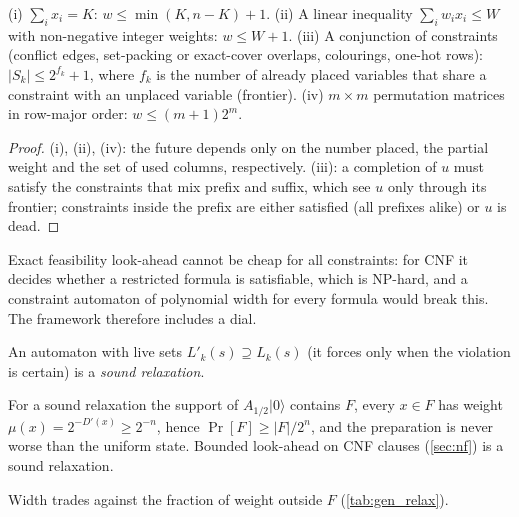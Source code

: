 \begin{proposition}\label{prop:width}
(i) $\sum_ix_i=K$: $w\le\min(K,n-K)+1$. (ii) A linear inequality $\sum_iw_ix_i\le W$ with non-negative integer weights: $w\le W+1$. (iii) A conjunction of constraints (conflict edges, set-packing or exact-cover overlaps, colourings, one-hot rows): $|S_k|\le2^{f_k}+1$, where $f_k$ is the number of already placed variables that share a constraint with an unplaced variable (frontier). (iv) $m\times m$ permutation matrices in row-major order: $w\le(m+1)2^m$.
\end{proposition}
\begin{proof}
(i), (ii), (iv): the future depends only on the number placed, the partial weight and the set of used columns, respectively. (iii): a completion of $u$ must satisfy the constraints that mix prefix and suffix, which see $u$ only through its frontier; constraints inside the prefix are either satisfied (all prefixes alike) or $u$ is dead.
\end{proof}
Exact feasibility look-ahead cannot be cheap for all constraints: for CNF it decides whether a restricted formula is satisfiable, which is NP-hard, and a constraint automaton of polynomial width for every formula would break this. The framework therefore includes a dial.
\begin{definition}
An automaton with live sets $L'_k(s)\supseteq L_k(s)$ (it forces only when the violation is certain) is a \emph{sound relaxation}.
\end{definition}
\begin{proposition}\label{prop:relax}
For a sound relaxation the support of $A_{1/2}|0\rangle$ contains $F$, every $x\in F$ has weight $\mu(x)=2^{-D'(x)}\ge2^{-n}$, hence $\Pr[F]\ge|F|/2^n$, and the preparation is never worse than the uniform state. Bounded look-ahead on CNF clauses (\cref{sec:nf}) is a sound relaxation.
\end{proposition}
Width trades against the fraction of weight outside $F$ (\cref{tab:gen_relax}).
